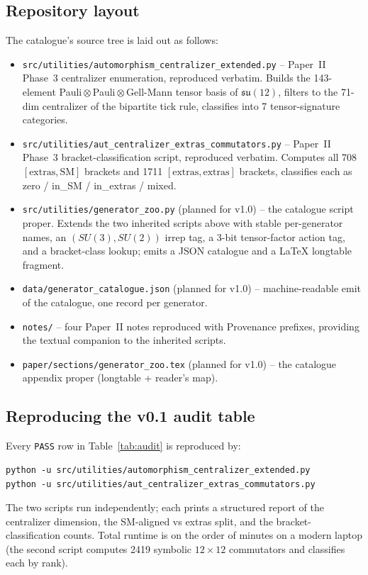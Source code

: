 \label{sec:code_and_data}

\subsection{Repository layout}

The catalogue's source tree is laid out as follows:

\begin{itemize}
\item \texttt{src/utilities/automorphism\_centralizer\_extended.py}
  -- Paper~II Phase~3 centralizer enumeration, reproduced verbatim.
  Builds the 143-element Pauli\,$\otimes$\,Pauli\,$\otimes$\,Gell-Mann
  tensor basis of $\mathfrak{su}(12)$, filters to the 71-dim
  centralizer of the bipartite tick rule, classifies into 7
  tensor-signature categories.
\item \texttt{src/utilities/aut\_centralizer\_extras\_commutators.py}
  -- Paper~II Phase~3 bracket-classification script, reproduced
  verbatim.  Computes all 708 $[\text{extras}, \text{SM}]$ brackets
  and 1711 $[\text{extras}, \text{extras}]$ brackets, classifies
  each as zero / in\_SM / in\_extras / mixed.
\item \texttt{src/utilities/generator\_zoo.py} (planned for
  v1.0) -- the catalogue script proper.  Extends the two
  inherited scripts above with stable per-generator names, an
  $(SU(3), SU(2))$ irrep tag, a 3-bit tensor-factor action tag,
  and a bracket-class lookup; emits a JSON catalogue and a
  \LaTeX{} longtable fragment.
\item \texttt{data/generator\_catalogue.json} (planned for v1.0)
  -- machine-readable emit of the catalogue, one record per
  generator.
\item \texttt{notes/} -- four Paper~II notes reproduced with
  Provenance prefixes, providing the textual companion to the
  inherited scripts.
\item \texttt{paper/sections/generator\_zoo.tex} (planned for v1.0)
  -- the catalogue appendix proper (longtable + reader's map).
\end{itemize}

\subsection{Reproducing the v0.1 audit table}

Every \texttt{PASS} row in Table~\ref{tab:audit} is reproduced by:

\begin{verbatim}
python -u src/utilities/automorphism_centralizer_extended.py
python -u src/utilities/aut_centralizer_extras_commutators.py
\end{verbatim}

The two scripts run independently; each prints a structured report
of the centralizer dimension, the SM-aligned vs extras split, and
the bracket-classification counts.  Total runtime is on the order
of minutes on a modern laptop (the second script computes 2419
symbolic $12 \times 12$ commutators and classifies each by rank).
